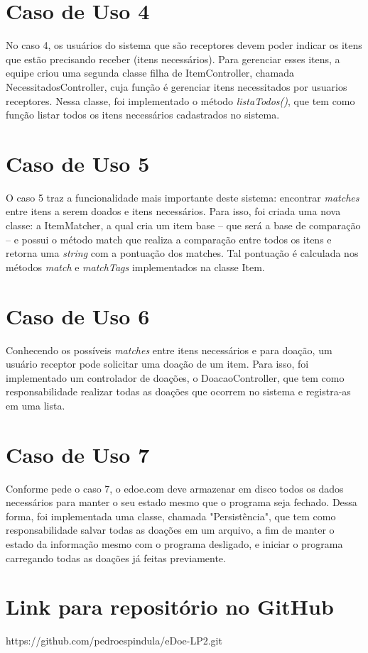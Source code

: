 \documentclass[journal,12pt,onecolumn,]{article}
\begin{document}
	
	\section{Caso de Uso 4}
	No caso 4, os usuários do sistema que são receptores devem poder indicar os itens que estão precisando receber (itens necessários). Para gerenciar esses itens, a equipe criou uma segunda classe filha de ItemController, chamada NecessitadosController, cuja função é gerenciar itens necessitados por usuarios receptores. Nessa classe, foi implementado o método \textit{listaTodos()}, que tem como função listar todos os itens necessários cadastrados no sistema.
	
	\section{Caso de Uso 5}
	O caso 5 traz a funcionalidade mais importante deste sistema: encontrar \textit{matches} entre itens a serem doados e itens necessários. Para isso, foi criada uma nova classe: a ItemMatcher, a qual cria um item base -- que será a base de comparação -- e possui o método match que realiza a comparação entre todos os itens e retorna uma \textit{string} com a pontuação dos matches. Tal pontuação é calculada nos métodos \textit{match} e \textit{matchTags} implementados na classe Item.
	
	\section{Caso de Uso 6}
	Conhecendo os possíveis \textit{matches} entre itens necessários e para doação, um usuário receptor pode solicitar uma doação de um item. Para isso, foi implementado um controlador de doações, o DoacaoController, que tem como responsabilidade realizar todas as doações que ocorrem no sistema e registra-as em uma lista.

	
	\section{Caso de Uso 7}	
	Conforme pede o caso 7, o edoe.com deve armazenar em disco todos os dados necessários para manter o seu estado mesmo que o programa seja fechado. Dessa forma, foi implementada uma classe, chamada "Persistência", que tem como responsabilidade salvar todas as doações em um arquivo, a fim de manter o estado da informação mesmo com o programa desligado, e iniciar o programa carregando todas as doações já feitas previamente. 
		
	
	\section{Link para repositório no GitHub}
	https://github.com/pedroespindula/eDoe-LP2.git
	
\end{document}
